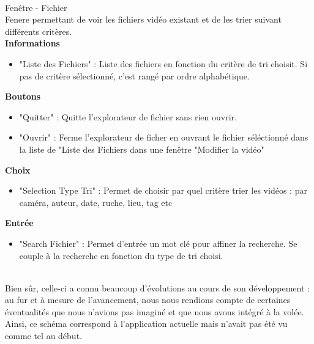 \documentclass[11pt,french,a4paper]{report}
\begin{document}
\dotfill \\

\Large Fenêtre - Fichier\normalsize \\
    Fenere permettant de voir les fichiers vidéo existant et de les trier suivant différents critères. \\
\large \textbf{Informations}\normalsize 
    \begin{itemize}[label=, leftmargin=*,parsep=0cm,itemsep=0cm,topsep=0cm]
        \item "Liste des Fichiers" : Liste des fichiers en fonction du critère de tri choisit. Si pas de critère sélectionné,
        c'est rangé par ordre alphabétique.
    \end{itemize}
\large \textbf{Boutons}\normalsize
    \begin{itemize}[label=, leftmargin=*,parsep=0cm,itemsep=0cm,topsep=0cm]
        \item "Quitter" : Quitte l'explorateur de fichier sans rien ouvrir.
        \item "Ouvrir" : Ferme l'explorateur de ficher en ouvrant le fichier séléctionné dans la liste de "Liste des Fichiers dans une
        fenêtre "Modifier la vidéo"
    \end{itemize}
\large \textbf{Choix}\normalsize
    \begin{itemize}[label=, leftmargin=*,parsep=0cm,itemsep=0cm,topsep=0cm]
        \item "Selection Type Tri" : Permet de choisir par quel critère trier les vidéos : par caméra, auteur, date, ruche, lieu, tag etc
    \end{itemize}
\large \textbf{Entrée}\normalsize
    \begin{itemize}[label=, leftmargin=*,parsep=0cm,itemsep=0cm,topsep=0cm]
        \item "Search Fichier" : Permet d'entrée un mot clé pour affiner la recherche. Se couple à la recherche en fonction du type de tri
        choisi.
    \end{itemize}
\dotfill \\
Bien sûr, celle-ci a connu beaucoup d'évolutions au cours de son développement : au fur et à mesure de l'avancement,
nous nous rendions compte de certaines éventualités que nous n'avions pas imaginé et que nous avons intégré à la volée. 
Ainsi, ce schéma correspond à l'application actuelle mais n'avait pas été vu comme tel au début. 
\end{document}
